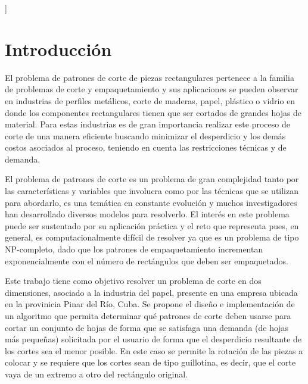 \documentclass[a4paper,10pt,twocolumn]{article}
\begin{document}
\vspace{0.8cm}
]



\section{Introducción}\label{sec:intro}
El problema de patrones de corte de piezas rectangulares pertenece a
la familia de problemas de corte y empaquetamiento y sus
aplicaciones se pueden observar en industrias de perfiles
metálicos, corte de maderas, papel, plástico o vidrio en
donde los componentes rectangulares tienen que ser
cortados de grandes hojas de material. Para estas industrias es de gran importancia realizar
este proceso de corte de una manera eficiente buscando
minimizar el desperdicio y los demás costos asociados
al proceso, teniendo en cuenta las restricciones técnicas
y de demanda. 



El problema de patrones de corte es un problema de gran
complejidad tanto por las características y variables
que involucra como por las técnicas que se utilizan
para abordarlo, es una temática en constante evolución
y muchos investigadores han desarrollado diversos
modelos para resolverlo. El interés en este problema
puede ser sustentado por su aplicación práctica y el
reto que representa pues, en general,
es computacionalmente difícil de resolver ya que es un
problema de tipo NP-completo, dado que los patrones de
empaquetamiento incrementan exponencialmente con el
número de rectángulos que deben ser empaquetados. 
 
Este trabajo tiene como objetivo resolver un problema de corte en dos dimensiones, asociado a la industria del papel, presente en una empresa ubicada en la provinicia Pinar del Río, Cuba. Se propone el  diseño e implementación de un algoritmo que permita determinar qué patrones de corte deben usarse para cortar un conjunto de hojas de forma que se satisfaga una demanda (de hojas más pequeñas) solicitada por el usuario de forma que el desperdicio resultante de los cortes sea el menor posible. En este caso se permite la rotación de las piezas a colocar y se requiere que los cortes sean de tipo guillotina, es decir, que  el corte vaya de un extremo a otro del rectángulo original. 
\end{document}
